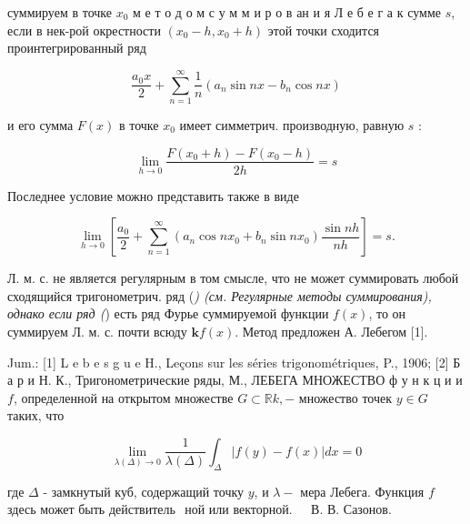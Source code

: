 \documentclass[10pt]{article}
\begin{document}
суммируем в точке $x_{0}$ м е т о д о м с у м м и р о в ан и я Л е б е г а к сумме $s$, если в нек-рой окрестности $\left(x_{0}-h, x_{0}+h\right)$ этой точки сходится проинтегрированный ряд



\[

\frac{a_{0} x}{2}+\sum_{n=1}^{\infty} \frac{1}{n}\left(a_{n} \sin n x-b_{n} \cos n x\right)

\]



и его сумма $F(x)$ в точке $x_{0}$ имеет симметрич. производную, равную $s$ :



\[

\lim _{h \rightarrow 0} \frac{F\left(x_{0}+h\right)-F\left(x_{0}-h\right)}{2 h}=s

\]



Последнее условие можно представить также в виде



\[

\lim _{h \rightarrow 0}\left[\frac{a_{0}}{2}+\sum_{n=1}^{\infty}\left(a_{n} \cos n x_{0}+b_{n} \sin n x_{0}\right) \frac{\sin n h}{n h}\right]=s .

\]



Л. м. с. не является регулярным в том смысле, что не может суммировать любой сходящийся тригонометрич. ряд (\textit{) (см. Регулярные методы суммирования), однако если ряд (}) есть ряд Фурье суммируемой функции $f(x)$, то он суммируем Л. м. с. почти всюду $\mathbf{k} f(x)$. Метод предложен А. Лебегом [1].



Jum.: [1] L e b e s g u e H., Leçons sur les séries trigonométriques, P., 1906; [2] Б а р и Н. К., Тригонометрические ряды, М., ЛЕБЕГА МНОЖЕСТВО ф у н к ц и и $f$, определенной на открытом множестве $G \subset \mathbb{R} k,-$ множество точек $y \in G$ таких, что



\[

\lim _{\lambda(\Delta) \rightarrow 0} \frac{1}{\lambda(\Delta)} \int_{\Delta}|f(y)-f(x)| d x=0

\]



где $\Delta$ - замкнутый куб, содержащий точку $y$, и $\lambda-$ мера Лебега. Функция $f$ здесь может быть действитель$\begin{array}{ll}\text { ной или векторной. } & \text { В. В. Сазонов. }\end{array}$
\end{document}
